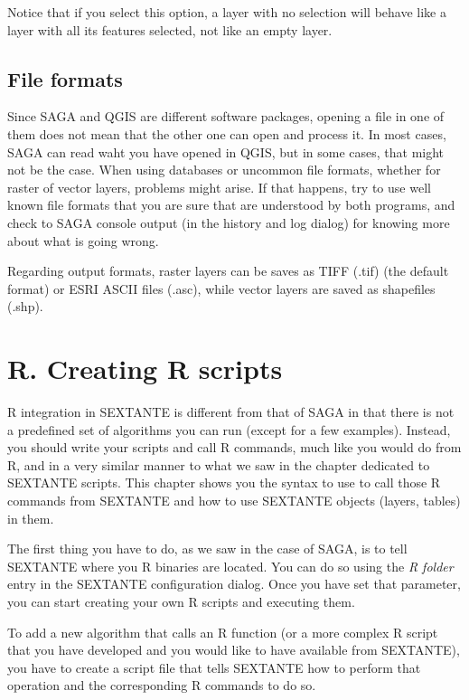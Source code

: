 Notice that if you select this option, a layer with no selection will behave like a layer with all its features selected, not like an empty layer.

\subsection{File formats}

Since SAGA and QGIS are different software packages, opening a file in one of them does not mean that the other one can open and process it. In most cases, SAGA can read waht you have opened in QGIS, but in some cases, that might not be the case. When using databases or uncommon file formats, whether for raster of vector layers, problems might arise. If that happens, try to use well known file formats that you are sure that are understood by both programs, and check to SAGA console output (in the history and log dialog) for knowing more about what is going wrong.

Regarding output formats, raster layers can be saves as TIFF (.tif) (the default format) or ESRI ASCII files (.asc), while vector layers are saved as shapefiles (.shp).

\section{R. Creating R scripts}\label{rscripts}

R integration in SEXTANTE is different from that of SAGA in that there is not a predefined set of algorithms you can run (except for a few examples). Instead, you should write your scripts and call R commands, much like you would do from R, and in a very similar manner to what we saw in the chapter dedicated to SEXTANTE scripts. This chapter shows you the syntax to use to call those R commands from SEXTANTE and how to use SEXTANTE objects (layers, tables) in them.

The first thing you have to do, as we saw in the case of SAGA, is to tell SEXTANTE where you R binaries are located. You can do so using the \emph{R folder} entry in the SEXTANTE configuration dialog. Once you have set that parameter, you can start creating your own R scripts and executing them.

To add a new algorithm that calls an R function (or a more complex R script that you have developed and you would like to have available from SEXTANTE), you have to create a script file that tells SEXTANTE how to perform that operation and the corresponding R commands to do so.

